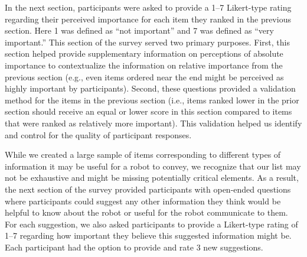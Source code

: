 \documentclass[letterpaper, 10 pt, conference]{ieeeconf}  %
\begin{document}
In the next section, participants were asked to provide a 1--7 Likert-type rating regarding their perceived importance for each item they ranked in the previous section. Here 1 was defined as ``not important'' and 7 was defined as ``very important.'' This section of the survey served two primary purposes. First, this section helped provide supplementary information on perceptions of absolute importance to contextualize the information on relative importance from the previous section (e.g., even items ordered near the end might be perceived as highly important by participants). Second, these questions provided a validation method for the items in the previous section (i.e., items ranked lower in the prior section should receive an equal or lower score in this section compared to items that were ranked as relatively more important). This validation helped us identify and control for the quality of participant responses. %

While we created a large sample of items corresponding to different types of information it may be useful for a robot to convey, we recognize that our list may not be exhaustive and might be missing potentially critical elements. As a result, the next section of the survey provided participants with open-ended questions where participants could suggest any other information they think would be helpful to know about the robot or useful for the robot communicate to them. For each suggestion, we also asked participants to provide a Likert-type rating of 1--7 regarding how important they believe this suggested information might be. Each participant had the option to provide and rate 3 new suggestions. %
\end{document}
